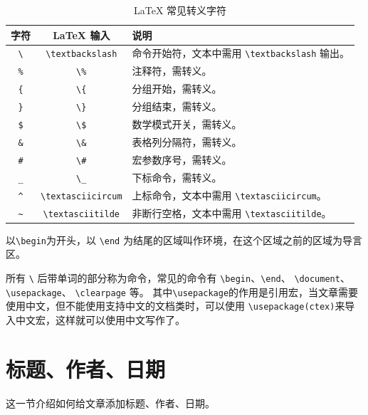 \documentclass[12pt,a4paper]{ctexart}
\begin{document}
  \begin{table}[htbp]
  \centering
  \caption{LaTeX 常见转义字符}
  \label{tab:escape-chars}
  \begin{tabularx}{\textwidth}{@{}c c X@{}}
    \toprule
    字符 & LaTeX 输入 & 说明 \\
    \midrule
     \texttt{\textbackslash} & \texttt{\textbackslash textbackslash} & 命令开始符，文本中需用 \texttt{\textbackslash textbackslash} 输出。 \\
     \texttt{\%} & \texttt{\textbackslash \%} & 注释符，需转义。 \\
     \texttt{\{} & \texttt{\textbackslash \{} & 分组开始，需转义。 \\
     \texttt{\}} & \texttt{\textbackslash \}} & 分组结束，需转义。 \\
     \texttt{\$} & \texttt{\textbackslash \$} & 数学模式开关，需转义。 \\
     \texttt{\&} & \texttt{\textbackslash \&} & 表格列分隔符，需转义。 \\
     \texttt{\#} & \texttt{\textbackslash \#} & 宏参数序号，需转义。 \\
     \texttt{\_} & \texttt{\textbackslash \_} & 下标命令，需转义。 \\
     \texttt{\textasciicircum} & \texttt{\textbackslash textasciicircum} & 上标命令，文本中需用 \texttt{\textbackslash textasciicircum}。 \\
     \texttt{\textasciitilde} & \texttt{\textbackslash textasciitilde} & 非断行空格，文本中需用 \texttt{\textbackslash textasciitilde}。 \\
    \bottomrule
  \end{tabularx}
\end{table}

以\texttt{\textbackslash begin}为开头，以 \texttt{\textbackslash end} 为结尾的区域叫作环境，在这个区域之前的区域为导言区。

  所有 \texttt{\textbackslash} 后带单词的部分称为命令，常见的命令有
  \texttt{\textbackslash begin}、\texttt{\textbackslash end}、
  \texttt{\textbackslash document}、\texttt{\textbackslash usepackage}、
  \texttt{\textbackslash clearpage} 等。
  其中\texttt{\textbackslash usepackage}的作用是引用宏，当文章需要使用中文，但不能使用支持中文的文档类时，可以使用
  \texttt{\textbackslash usepackage(ctex)}来导入中文宏，这样就可以使用中文写作了。

\section{标题、作者、日期}
这一节介绍如何给文章添加标题、作者、日期。
\end{document}
